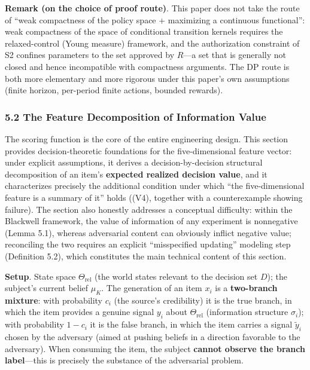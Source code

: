 \documentclass[
  11pt]{article}
\begin{document}
\textbf{Remark (on the choice of proof route)}. This paper does not take
the route of ``weak compactness of the policy space + maximizing a
continuous functional'': weak compactness of the space of conditional
transition kernels requires the relaxed-control (Young measure)
framework, and the authorization constraint of S2 confines parameters to
the set approved by \(R\)---a set that is generally not closed and hence
incompatible with compactness arguments. The DP route is both more
elementary and more rigorous under this paper's own assumptions (finite
horizon, per-period finite actions, bounded rewards).

\subsubsection{5.2 The Feature Decomposition of Information
Value}\label{the-feature-decomposition-of-information-value}

The scoring function is the core of the entire engineering design. This
section provides decision-theoretic foundations for the five-dimensional
feature vector: under explicit assumptions, it derives a
decision-by-decision structural decomposition of an item's
\textbf{expected realized decision value}, and it characterizes
precisely the additional condition under which ``the five-dimensional
feature is a summary of it'' holds ((V4), together with a counterexample
showing failure). The section also honestly addresses a conceptual
difficulty: within the Blackwell framework, the value of information of
any experiment is nonnegative (Lemma 5.1), whereas adversarial content
can obviously inflict negative value; reconciling the two requires an
explicit ``misspecified updating'' modeling step (Definition 5.2), which
constitutes the main technical content of this section.

\textbf{Setup}. State space \(\Theta_{\mathrm{rel}}\) (the world states
relevant to the decision set \(D\)); the subject's current belief
\(\mu_K\). The generation of an item \(x_i\) is a \textbf{two-branch
mixture}: with probability \(c_i\) (the source's credibility) it is the
true branch, in which the item provides a genuine signal \(y_i\) about
\(\Theta_{\mathrm{rel}}\) (information structure \(\sigma_i\)); with
probability \(1 - c_i\) it is the false branch, in which the item
carries a signal \(\tilde y_i\) chosen by the adversary (aimed at
pushing beliefs in a direction favorable to the adversary). When
consuming the item, the subject \textbf{cannot observe the branch
label}---this is precisely the substance of the adversarial problem.
\end{document}
